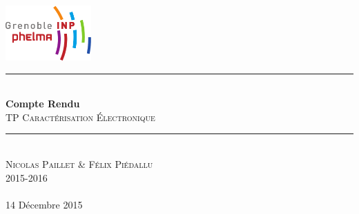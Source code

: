 \begin{titlepage}
    \vspace*{-10px}
    \includegraphics[height=80px]{logo_phelma.pdf}
    \vspace*{-80px}
\begin{flushright}
    \vspace*{60px}
\end{flushright}

\vspace*{0.5cm}
\begin{center}
\rule{\linewidth}{0.5mm}\\[0.4cm]
{\huge{\bfseries Compte Rendu}\\[0.4cm]
\textsc{TP Caractérisation Électronique}\\[0.4cm]}
\rule{\linewidth}{0.5mm}\\[0.5cm]

\LARGE{\textsc{Nicolas Paillet \& Félix Piédallu}}\\[0.7cm]
\large{\textsc{2015-2016}}\\[2cm]

\Large{~}\\[1cm]

\large{14 Décembre 2015}\\[2cm]


\end{center}
\end{titlepage}

\tableofcontents        %
\newpage
{}  %
